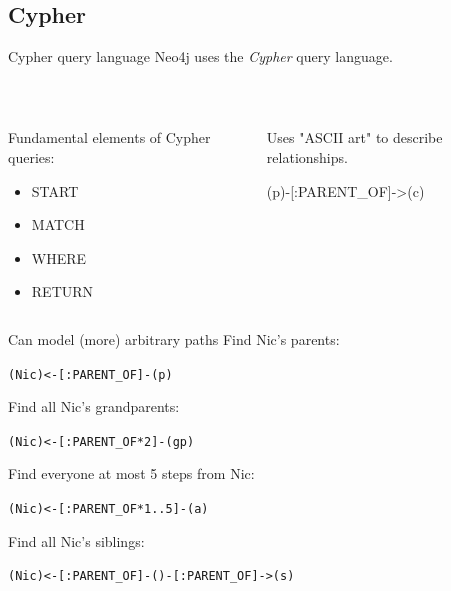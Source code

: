 \documentclass{beamer}
\newcommand{\linespace}{\vskip 0.25cm}
\begin{document}
\subsection{Cypher}

\begin{frame}{Cypher query language}
			Neo4j uses the \emph{Cypher} query language.

			\linespace
			
			~\\
			
			\linespace

	\begin{columns}
		\begin{column}[T]{0.5\textwidth}
			
			Fundamental elements of Cypher queries:
		\begin{itemize}
			\item START
			\item MATCH
			\item WHERE
			\item RETURN
		\end{itemize}
		
	\end{column}
	\begin{column}[T]{0.5\textwidth}
		Uses "ASCII art" to describe relationships.

	\linespace

(p)-[:PARENT\_OF]->(c)

	\end{column}	
	\end{columns}
\end{frame}

\begin{frame}{Can model (more) arbitrary paths}
	Find Nic's parents:
	
	\begin{center}
		\texttt{(Nic)<-[:PARENT\_OF]-(p)}
	\end{center}
	
	Find all Nic's grandparents:
	
	\begin{center}
		\texttt{(Nic)<-[:PARENT\_OF*2]-(gp)}
	\end{center}
	
	Find everyone at most 5 steps from Nic:
	
	\begin{center}
			\texttt{(Nic)<-[:PARENT\_OF*1..5]-(a)}
	\end{center}
	
	Find all Nic's siblings:
	
	\begin{center}
		\texttt{(Nic)<-[:PARENT\_OF]-()-[:PARENT\_OF]->(s)}
	\end{center}
	
\end{frame}
\end{document}

